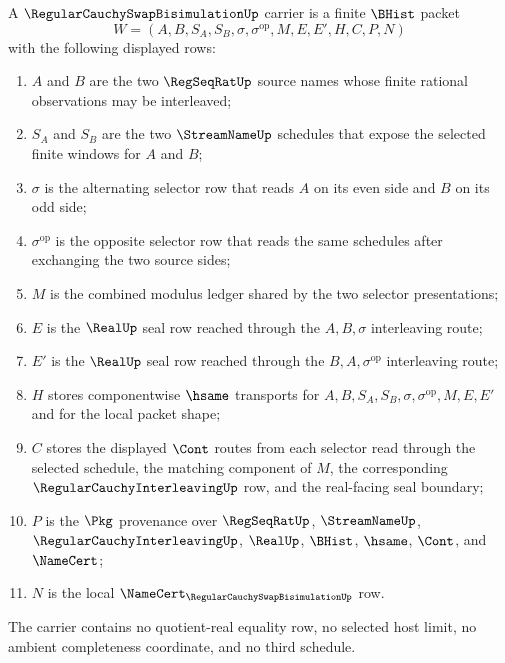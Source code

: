 \begin{definition}
\label{def:regular-cauchy-swap-bisimulation-carrier}
A $\RegularCauchySwapBisimulationUp$ carrier is a finite $\BHist$ packet
$$
W=(A,B,S_A,S_B,\sigma,\sigma^{\mathrm{op}},M,E,E',H,C,P,N)
$$
with the following displayed rows:
\begin{enumerate}
\item $A$ and $B$ are the two $\RegSeqRatUp$ source names whose finite rational observations may be interleaved;
\item $S_A$ and $S_B$ are the two $\StreamNameUp$ schedules that expose the selected finite windows for $A$ and $B$;
\item $\sigma$ is the alternating selector row that reads $A$ on its even side and $B$ on its odd side;
\item $\sigma^{\mathrm{op}}$ is the opposite selector row that reads the same schedules after exchanging the two source sides;
\item $M$ is the combined modulus ledger shared by the two selector presentations;
\item $E$ is the $\RealUp$ seal row reached through the $A,B,\sigma$ interleaving route;
\item $E'$ is the $\RealUp$ seal row reached through the $B,A,\sigma^{\mathrm{op}}$ interleaving route;
\item $H$ stores componentwise $\hsame$ transports for $A,B,S_A,S_B,\sigma,\sigma^{\mathrm{op}},M,E,E'$ and for the local packet shape;
\item $C$ stores the displayed $\Cont$ routes from each selector read through the selected schedule, the matching component of $M$, the corresponding $\RegularCauchyInterleavingUp$ row, and the real-facing seal boundary;
\item $P$ is the $\Pkg$ provenance over $\RegSeqRatUp$, $\StreamNameUp$, $\RegularCauchyInterleavingUp$, $\RealUp$, $\BHist$, $\hsame$, $\Cont$, and $\NameCert$;
\item $N$ is the local $\NameCert_{\RegularCauchySwapBisimulationUp}$ row.
\end{enumerate}
The carrier contains no quotient-real equality row, no selected host limit, no ambient completeness coordinate, and no third schedule.
\end{definition}

